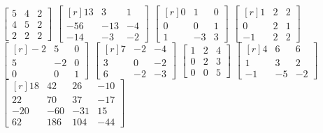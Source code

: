 \begin{tasks}[
    style=enumerate,
    label-offset = 3mm,
    ]
    \task $\begin{bmatrix*}5 & 4 & 2 \\ 4 & 5 & 2 \\ 2 & 2 & 2\end{bmatrix*}$
    \task $\begin{bmatrix*}[r]13 & 3 & 1 \\ -56 & -13 & -4 \\ -14 & -3 & -2\end{bmatrix*}$
    \task $\begin{bmatrix*}[r]0 & 1 & 0 \\ 0 & 0 & 1 \\ 1 & -3 & 3\end{bmatrix*}$
    \task $\begin{bmatrix*}[r]1 & 2 & 2 \\ 0 & 2 & 1 \\ -1 & 2 & 2\end{bmatrix*}$
    \task $\begin{bmatrix*}[r]-2 & 5 & 0 \\ 5 & -2 & 0 \\ 0 & 0 & 1\end{bmatrix*}$
    \task $\begin{bmatrix*}[r]7 & -2 & -4 \\ 3 & 0 & -2 \\ 6 & -2 & -3\end{bmatrix*}$
    \task $\begin{bmatrix*}1 & 2 & 4 \\ 0 & 2 & 3 \\ 0 & 0 & 5\end{bmatrix*}$
    \task $\begin{bmatrix*}[r]4 & 6 & 6 \\ 1 & 3 & 2 \\ -1 & -5 & -2\end{bmatrix*}$
    \task $\begin{bmatrix*}[r]18 & 42 & 26 & -10 \\ 22 & 70 & 37 & -17 \\ -20 & -60 & -31 & 15 \\ 62 & 186 & 104 & -44\end{bmatrix*}$

\end{tasks}

